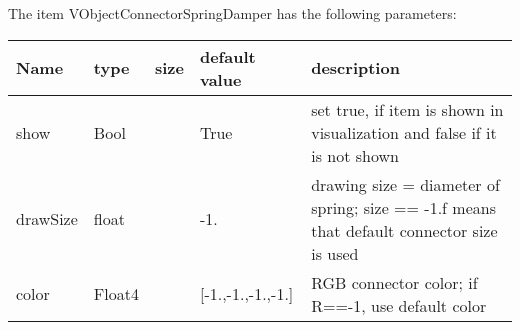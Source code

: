 The item VObjectConnectorSpringDamper has the following parameters:
\begin{center}
  \footnotesize
  \begin{longtable}{| p{4.5cm} | p{2.5cm} | p{0.5cm} | p{2.5cm} | p{6cm} |}
    \hline
    \bf Name & \bf type & \bf size & \bf default value & \bf description \\ \hline
    show &     Bool &      &     True &     set true, if item is shown in visualization and false if it is not shown\\ \hline
    drawSize &     float &      &     -1. &     drawing size = diameter of spring; size == -1.f means that default connector size is used\\ \hline
    color &     Float4 &      &     [-1.,-1.,-1.,-1.] &     RGB connector color; if R==-1, use default color\\ \hline
	  \end{longtable}
	\end{center}

